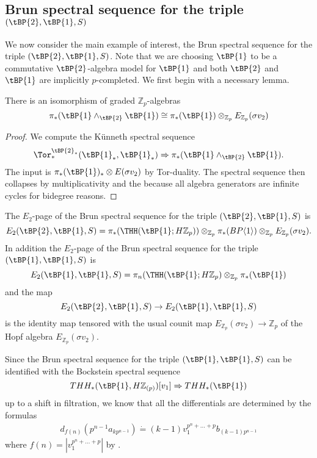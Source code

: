 \subsection{Brun spectral sequence for the triple $(\tBP{2},\tBP{1},S)$}
We now consider the main example of interest, the Brun spectral sequence for the triple $(\tBP{2},\tBP{1},S)$. Note that we are choosing $\tBP{1}$ to be a commutative $\tBP{2}$-algebra model for $\tBP{1}$ and both $\tBP{2}$ and $\tBP{1}$ are implicitly $p$-completed. We first begin with a necessary lemma. 
\begin{lem}
There is an isomorphism of graded $\mathbb{Z}_p$-algebras 
\[ \pi_*(\tBP{1}\wedge_{\tBP{2}}\tBP{1})\cong \pi_*(\tBP{1})\otimes_{\mathbb{Z}_p} E_{\mathbb{Z}_p}(\sigma v_2)\] 
\end{lem}
\begin{proof}
We compute the K\"unneth spectral sequence 
\[  \Tor_*^{\tBP{2}_*}(\tBP{1}_*,\tBP{1}_*)\Rightarrow \pi_*(\tBP{1}\wedge_{\tBP{2}}\tBP{1}).\]
The input is $\pi_*(\tBP{1})_*\otimes E(\sigma v_2)$ by Tor-duality. The spectral sequence then collapses by multiplicativity and the because all algebra generators are infinite cycles for bidegree reasons. 
\end{proof}

\begin{cor}
The $E_2$-page of the Brun spectral sequence for the triple $(\tBP{2},\tBP{1},S)$ is 
\[ E_2(\tBP{2},\tBP{1},S)= \pi_*(\THH(\tBP{1};H\mathbb{Z}_p))\otimes_{\mathbb{Z}_p} \pi_*(BP\langle 1\rangle )\otimes_{\mathbb{Z}_p} E_{\mathbb{Z}_p}(\sigma v_2).\]
In addition the $E_2$-page of the Brun spectral sequence for the triple $(\tBP{1},\tBP{1},S)$ is 
\[ E_2(\tBP{1},\tBP{1},S)=\pi_n(\THH(\tBP{1};H\mathbb{Z}_p)\otimes_{\mathbb{Z}_p}\pi_*(\tBP{1}) \] 
and the map 
\[ E_2(\tBP{2},\tBP{1},S) \to E_2(\tBP{1},\tBP{1},S) \]
is the identity map tensored with the usual counit map $E_{\mathbb{Z}_p}(\sigma v_2)\to \mathbb{Z}_p$ of the Hopf algebra $E_{\mathbb{Z}_p}(\sigma v_2)$. 
\end{cor}

Since the Brun spectral sequence for the triple $(\tBP{1},\tBP{1},S)$  can be identified with the Bockstein spectral sequence 
\[ THH_*(\tBP{1},H\mathbb{Z}_{(p)})[v_1]\Rightarrow THH_*(\tBP{1})\]
up to a shift in filtration, we know that  all the differentials are 
determined by the formulas
\begin{align}\label{AHL diff Brun filt}
d_{f(n)}(p^{n-1}a_{kp^{n-1}})\dot{=}(k-1)v_1^{p^n+\dots +p}b_{(k-1)p^{n-1}} 
\end{align}
where $f(n)=|v_1^{p^n+\dots +p}|$ by \cite{AHL}. 

